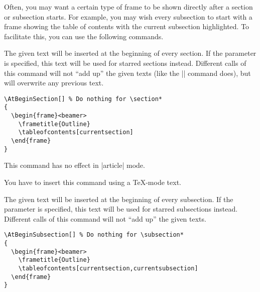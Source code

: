 Often, you may want a certain type of frame to be shown directly after a section or subsection starts. For example, you may wish every subsection to start with a frame showing the table of contents with the current subsection highlighted. To facilitate this, you can use the following commands.

\begin{command}{\AtBeginSection{}}
  The given text will be inserted at the beginning of every section. If the  parameter is specified, this text will be used for starred sections instead. Different calls of this command will not ``add up'' the given texts (like the |\AtBeginDocument| command does), but will overwrite any previous text.

  \example
\begin{verbatim}
\AtBeginSection[] % Do nothing for \section*
{
  \begin{frame}<beamer>
    \frametitle{Outline}
    \tableofcontents[currentsection]
  \end{frame}
}
\end{verbatim}

  \articlenote
  This command has no effect in |article| mode.

  \lyxnote
  You have to insert this command using a \TeX-mode text.
\end{command}

\begin{command}{\AtBeginSubsection{}}
  The given text will be inserted at the beginning of every subsection. If the  parameter is specified, this text will be used for starred subsections instead. Different calls of this command will not ``add up'' the given texts.

  \example
\begin{verbatim}
\AtBeginSubsection[] % Do nothing for \subsection*
{
  \begin{frame}<beamer>
    \frametitle{Outline}
    \tableofcontents[currentsection,currentsubsection]
  \end{frame}
}
\end{verbatim}
\end{command}

